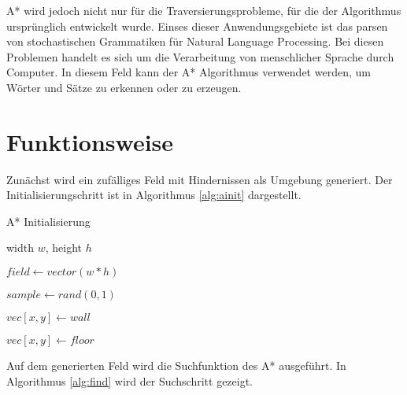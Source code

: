 \documentclass[10pt,twocolumn]{scrartcl}
\begin{document}
A* wird jedoch nicht nur für die Traversierungsprobleme, für die der Algorithmus ursprünglich entwickelt wurde.
Einses dieser Anwendungsgebiete ist das parsen von stochastischen Grammatiken für Natural Language Processing.
Bei diesen Problemen handelt es sich um die Verarbeitung von menschlicher Sprache durch Computer.
In diesem Feld kann der A* Algorithmus verwendet werden, um Wörter und Sätze zu erkennen oder zu erzeugen.

\section*{Funktionsweise}



Zunächst wird ein zufälliges Feld mit Hindernissen als Umgebung generiert. Der Initialisierungschritt ist in Algorithmus \ref{alg:ainit} dargestellt. 

\begin{algorithm} 
\caption{A* Initialisierung} 
\label{alg:ainit} 
\begin{algorithmic}
	\REQUIRE width $w$, height $h$
	
	\STATE $field \leftarrow vector(w*h)$
	
	

	\STATE $sample \leftarrow rand(0,1)$	

	\STATE $vec[x,y] \leftarrow wall$	
	
	\ELSE
	
	\STATE $vec[x,y] \leftarrow floor$	
	
	\ENDIF	
	
	\ENDFOR
	\ENDFOR
\end{algorithmic}
\end{algorithm}

Auf dem generierten Feld wird die Suchfunktion des A* ausgeführt. In Algorithmus \ref{alg:find} wird der Suchschritt gezeigt.
\end{document}
